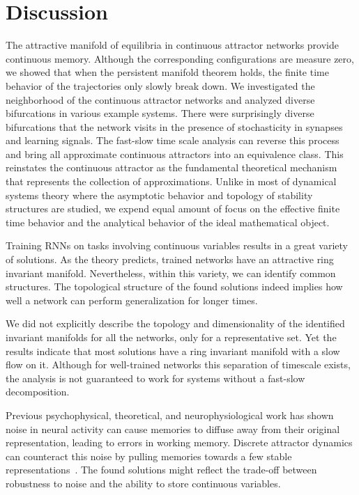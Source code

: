 \documentclass{article} %
\newcounter{ct}
\theoremstyle{definition}
\theoremstyle{remark}
\begin{document}
\section{Discussion}
The attractive manifold of equilibria in continuous attractor networks provide continuous memory.
Although the corresponding configurations are measure zero, we showed that when the persistent manifold theorem holds, the finite time behavior of the trajectories only slowly break down.
We investigated the neighborhood of the continuous attractor networks and analyzed diverse bifurcations in various example systems.
There were surprisingly diverse bifurcations that the network visits in the presence of stochasticity in synapses and learning signals.
The fast-slow time scale analysis can reverse this process and bring all approximate continuous attractors into an equivalence class.
This reinstates the continuous attractor as the fundamental theoretical mechanism that represents the collection of approximations.
Unlike in most of dynamical systems theory where the asymptotic behavior and topology of stability structures are studied, we expend equal amount of focus on the effective finite time behavior and the analytical behavior of the ideal mathematical object.

Training RNNs on tasks involving continuous variables results in a great variety of solutions.
As the theory predicts, trained networks have an attractive ring invariant manifold.
 Nevertheless, within this variety, we can identify common structures.
The topological structure of the found solutions indeed implies how well a network can perform generalization for longer times.

We did not explicitly describe the topology and dimensionality of the identified invariant manifolds for all the networks, only for a representative set.
Yet the results indicate that most solutions have a ring invariant manifold with a slow flow on it.
Although for well-trained networks this separation of timescale exists, the analysis is not guaranteed to work for systems without a fast-slow decomposition.	

Previous psychophysical, theoretical, and neurophysiological work has shown noise in neural activity can cause memories to diffuse away from their original representation, leading to errors in working memory.
Discrete attractor dynamics can counteract this noise by pulling memories towards a few stable representations~\citep{panichello2019,Koulakov2002,Goldman2003-cz}.
The found solutions might reflect the trade-off between robustness to noise and the ability to store continuous variables.
\end{document}

